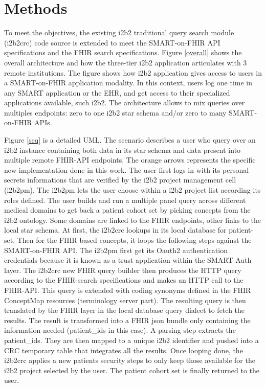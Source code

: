 \documentclass{amia}
\newcommand{\remNico}[1]{\todo[color=orange]{[NP]{\scriptsize #1\par}}}
\begin{document}
\section*{Methods}

To meet the objectives, the existing i2b2 traditional query search module (i2b2crc) code source is extended to meet the SMART-on-FHIR API specifications and the FHIR search specifications. Figure \ref{overall} shows the overall architecture and how the three-tier i2b2 application articulates with 3 remote institutions. The figure shows how i2b2 application gives access to users in a SMART-on-FHIR application modality. In this context, users log one time in any SMART application or the EHR, and get access to their specialized applications available, such i2b2. The architecture allows to mix queries over multiples endpoints: zero to one i2b2 star schema and/or zero to many SMART-on-FHIR APIs.

Figure \ref{seq} is a detailed UML. The scenario describes a user who query over an i2b2 instance containing both data in its star schema and data present into multiple remote FHIR-API endpoints. The orange arrows represents the specific new implementation done in this work. The user first logs-in with its personal secrets informations that are verified by the i2b2 project management cell (i2b2pm). The i2b2pm lets the user choose within a i2b2 project list according its roles defined. The user builds and run a multiple panel query across different medical domains to get back a patient cohort set by picking concepts from the i2b2 ontology. Some domains are linked to the FHIR endpoints, other links to the local star schema. At first, the i2b2crc lookups in its local database for patient-set. Then for the FHIR based concepts, it loops the following steps against the SMART-on-FHIR API. The i2b2pm first get its Oauth2 authentication credentials because it is known as a trust application within the SMART-Auth layer. The i2b2crc new FHIR query builder then produces the HTTP query according to the FHIR-search specifications and makes an HTTP call to the FHIR-API. This query is extended with coding synonyms defined in the FHIR ConceptMap resources (terminology server part). The resulting query is then translated by the FHIR layer in the local database query dialect to fetch the results. The result is transformed into a FHIR json bundle only containing the information needed (patient\_ids in this case). A parsing step extracts the patient\_ids. They are then mapped to a unique i2b2 identifier and pushed into a CRC temporary table that integrates all the results. Once looping done, the i2b2crc applies a new patients security steps to only keep those available for the i2b2 project selected by the user. The patient cohort set is finally returned to the user.
\end{document}
